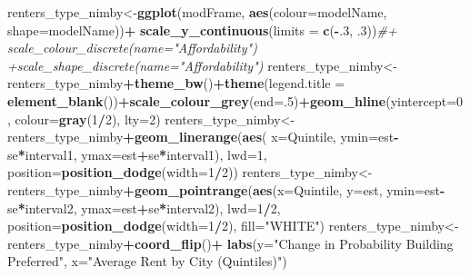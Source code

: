 \documentclass[]{article}
\newenvironment{Shaded}{\begin{snugshade}}{\end{snugshade}}
\newcommand{\CommentTok}[1]{\textcolor[rgb]{0.56,0.35,0.01}{\textit{#1}}}
\newcommand{\DataTypeTok}[1]{\textcolor[rgb]{0.13,0.29,0.53}{#1}}
\newcommand{\DecValTok}[1]{\textcolor[rgb]{0.00,0.00,0.81}{#1}}
\newcommand{\FloatTok}[1]{\textcolor[rgb]{0.00,0.00,0.81}{#1}}
\newcommand{\KeywordTok}[1]{\textcolor[rgb]{0.13,0.29,0.53}{\textbf{#1}}}
\newcommand{\NormalTok}[1]{#1}
\newcommand{\OperatorTok}[1]{\textcolor[rgb]{0.81,0.36,0.00}{\textbf{#1}}}
\newcommand{\StringTok}[1]{\textcolor[rgb]{0.31,0.60,0.02}{#1}}
\begin{document}
\begin{Shaded}
\begin{Highlighting}[]
{{{\NormalTok{renters_type_nimby<-}\KeywordTok{ggplot}\NormalTok{(modFrame, }\KeywordTok{aes}\NormalTok{(}\DataTypeTok{colour=}\NormalTok{modelName, }\DataTypeTok{shape=}\NormalTok{modelName))}\OperatorTok{+}\StringTok{ }\KeywordTok{scale_y_continuous}\NormalTok{(}\DataTypeTok{limits =} \KeywordTok{c}\NormalTok{(}\OperatorTok{-}\NormalTok{.}\DecValTok{3}\NormalTok{, }\FloatTok{.3}\NormalTok{))}\CommentTok{#+ scale_colour_discrete(name="Affordability") +scale_shape_discrete(name="Affordability")}
\NormalTok{renters_type_nimby<-renters_type_nimby}\OperatorTok{+}\KeywordTok{theme_bw}\NormalTok{()}\OperatorTok{+}\KeywordTok{theme}\NormalTok{(}\DataTypeTok{legend.title =} \KeywordTok{element_blank}\NormalTok{())}\OperatorTok{+}\KeywordTok{scale_colour_grey}\NormalTok{(}\DataTypeTok{end=}\NormalTok{.}\DecValTok{5}\NormalTok{)}\OperatorTok{+}\KeywordTok{geom_hline}\NormalTok{(}\DataTypeTok{yintercept=}\DecValTok{0}\NormalTok{, }\DataTypeTok{colour=}\KeywordTok{gray}\NormalTok{(}\DecValTok{1}\OperatorTok{/}\DecValTok{2}\NormalTok{), }\DataTypeTok{lty=}\DecValTok{2}\NormalTok{)}
\NormalTok{renters_type_nimby<-renters_type_nimby}\OperatorTok{+}\KeywordTok{geom_linerange}\NormalTok{(}\KeywordTok{aes}\NormalTok{( }\DataTypeTok{x=}\NormalTok{Quintile, }\DataTypeTok{ymin=}\NormalTok{est}\OperatorTok{-}\NormalTok{se}\OperatorTok{*}\NormalTok{interval1, }
                                                           \DataTypeTok{ymax=}\NormalTok{est}\OperatorTok{+}\NormalTok{se}\OperatorTok{*}\NormalTok{interval1), }\DataTypeTok{lwd=}\DecValTok{1}\NormalTok{, }\DataTypeTok{position=}\KeywordTok{position_dodge}\NormalTok{(}\DataTypeTok{width=}\DecValTok{1}\OperatorTok{/}\DecValTok{2}\NormalTok{))}
\NormalTok{renters_type_nimby<-renters_type_nimby}\OperatorTok{+}\KeywordTok{geom_pointrange}\NormalTok{(}\KeywordTok{aes}\NormalTok{(}\DataTypeTok{x=}\NormalTok{Quintile, }\DataTypeTok{y=}\NormalTok{est, }\DataTypeTok{ymin=}\NormalTok{est}\OperatorTok{-}\NormalTok{se}\OperatorTok{*}\NormalTok{interval2,}
                                                           \DataTypeTok{ymax=}\NormalTok{est}\OperatorTok{+}\NormalTok{se}\OperatorTok{*}\NormalTok{interval2), }\DataTypeTok{lwd=}\DecValTok{1}\OperatorTok{/}\DecValTok{2}\NormalTok{,}
                                                       \DataTypeTok{position=}\KeywordTok{position_dodge}\NormalTok{(}\DataTypeTok{width=}\DecValTok{1}\OperatorTok{/}\DecValTok{2}\NormalTok{),  }\DataTypeTok{fill=}\StringTok{"WHITE"}\NormalTok{)}
\NormalTok{renters_type_nimby<-renters_type_nimby}\OperatorTok{+}\KeywordTok{coord_flip}\NormalTok{()}\OperatorTok{+}\StringTok{ }\KeywordTok{labs}\NormalTok{(}\DataTypeTok{y=}\StringTok{"Change in Probability Building Preferred"}\NormalTok{, }\DataTypeTok{x=}\StringTok{"Average Rent by City (Quintiles)"}\NormalTok{)}
}}}
\end{Highlighting}
\end{Shaded}
\end{document}
